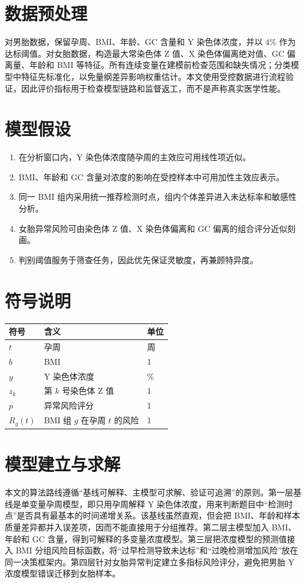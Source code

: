 \documentclass[UTF8]{ctexart}
\begin{document}
\section{数据预处理}
对男胎数据，保留孕周、BMI、年龄、GC 含量和 Y 染色体浓度，并以 $4\%$ 作为达标阈值。对女胎数据，构造最大常染色体 Z 值、X 染色体偏离绝对值、GC 偏离量、年龄和 BMI 等特征。所有连续变量在建模前检查范围和缺失情况；分类模型中特征先标准化，以免量纲差异影响权重估计。本文使用受控数据进行流程验证，因此评价指标用于检查模型链路和监督返工，而不是声称真实医学性能。

\section{模型假设}
\begin{enumerate}
\item 在分析窗口内，Y 染色体浓度随孕周的主效应可用线性项近似。
\item BMI、年龄和 GC 含量对浓度的影响在受控样本中可用加性主效应表示。
\item 同一 BMI 组内采用统一推荐检测时点，组内个体差异进入未达标率和敏感性分析。
\item 女胎异常风险可由染色体 Z 值、X 染色体偏离和 GC 偏离的组合评分近似刻画。
\item 判别阈值服务于筛查任务，因此优先保证灵敏度，再兼顾特异度。
\end{enumerate}

\section{符号说明}
\begin{center}
\begin{tabular}{lll}
\toprule
符号 & 含义 & 单位\\
\midrule
$t$ & 孕周 & 周\\
$b$ & BMI & 1\\
$y$ & Y 染色体浓度 & \%\\
$z_k$ & 第 $k$ 号染色体 Z 值 & 1\\
$p$ & 异常风险评分 & 1\\
$R_g(t)$ & BMI 组 $g$ 在孕周 $t$ 的风险 & 1\\
\bottomrule
\end{tabular}
\end{center}

\section{模型建立与求解}
本文的算法路线遵循“基线可解释、主模型可求解、验证可追溯”的原则。第一层基线是单变量孕周模型，即只用孕周解释 Y 染色体浓度，用来判断题目中“检测时点”是否具有最基本的时间递增关系。该基线虽然直观，但会把 BMI、年龄和样本质量差异都并入误差项，因而不能直接用于分组推荐。第二层主模型加入 BMI、年龄和 GC 含量，得到可解释的多变量浓度模型。第三层把浓度模型的预测值接入 BMI 分组风险目标函数，将“过早检测导致未达标”和“过晚检测增加风险”放在同一决策框架内。第四层针对女胎异常判定建立多指标风险评分，避免把男胎 Y 浓度模型错误迁移到女胎样本。
\end{document}
